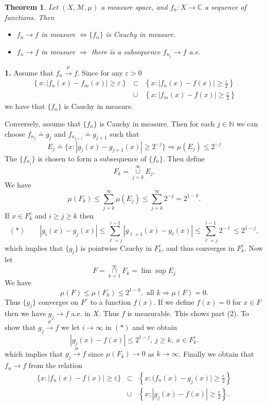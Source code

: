 \documentclass[12pt]{report}
\newtheorem{theorem}{Theorem}[section]
\begin{document}
\begin{theorem} Let $(X, \mathcal{M}, \mu)$ a measure space, and
$f_n: X \longrightarrow \mathbb{C}$ a sequence of functions.  Then
\begin{itemize}
\item[1.]   $f_n \longrightarrow f$ in measure $\Longleftrightarrow
\{f_n\}$ is Cauchy in measure.
\item[2.]  $f_n \longrightarrow f$ in measure $\Longrightarrow $ there is
a subsequence $f_{n_j} \to f$ a.e.
\end{itemize}
\end{theorem}

\medskip
{} \textbf{1.}  Assume that $f_n
\stackrel{\mu}{\longrightarrow} f$. Since for any $\varepsilon > 0 $
\begin{eqnarray*}
\left \{x: |f_n(x) - f_m(x) | \ge \varepsilon \right \} &\subset&
\left \{x: |f_n(x) - f(x)|\ge\frac{\varepsilon}{2}\right \}\\ &\cup& \left
\{x : |f_m(x) - f(x) | \ge \frac{\varepsilon}{2}\right \}
\end{eqnarray*} we have that $ \{f_n\}$ is Cauchy in measure.

Conversely, assume that $\{f_n\}$ is Cauchy in measure.  Then for each $j
\in
\mathbb{N}$ we can choose $f_{n_j} \doteq	 g_j$ and $f_{n_{j+1}} \doteq
g_{j+1}$ such that
\[ E_j \doteq \{x: |g_j(x) - g_{j+1} (x)| \ge 2^{-j}\} \Longrightarrow
\mu(E_j) \le 2^{-j}
\] The $\{f_{n_j}\}$ is chosen to form a subsequence of $\{f_n\}$.  Then
define
\[ F_k = \overset{\infty}{\underset{j=k}{\cup}} E_j.
\] We have
\[
\mu(F_k) \le \sum^\infty_{j=k} \mu(E_j) \le \sum^\infty_{j=k} 2^{-j} =
2^{1-k}.
\] If $ x \in F^c_k $ and $i \ge j \ge k$ then 
\[ (\ast) \qquad  |g_i(x) - g_j(x)| \le \sum^{i-1}_{\ell=j} |g_{\ell + 1} (x) -
g_\ell (x)|
\le \sum^{i-1}_{\ell = j}2^{-\ell} \le 2^{1 - j},
\] which implies that $\{g_j\}$ is pointwise Cauchy in $F^c_k$, and thus
converges in $F^c_k$.  Now let
\[ F = \overset{\infty}{\underset{k=1}{\cap}} F_k = \lim \sup E_j
\] We have
\[\mu(F) \le \mu(F_k) \le 2^{1-k} , \mbox{ all } k\Longrightarrow \mu(F)
= 0.
\] Thus $\{g_j\}$ converges on $F^c$ to a function $f(x)$. If we define 
$f(x) = 0$ for
$x \in F$ then we have $g_j \longrightarrow f$ a.e. in $X$.  Thus $f$ is
measurable.  This shows part (2).  To show that $g_j
\stackrel{\mu}{\longrightarrow } f$ we let $i \rightarrow \infty$ in
$(\ast)$ and we obtain
\[ |g_j(x) - f(x) | \le 2^{1 - j}, \ j \ge k, \ x \in F^c_k.
\] which implies that $g_j \stackrel{\mu}{\longrightarrow} f$ since
$\mu(F_k) \to 0$ as $k \to \infty$.  Finally we obtain that $f_n
\longrightarrow f$ from the relation
\begin{eqnarray*}
\{x: |f_n(x) - f(x) | \ge \varepsilon \} &\subset& \left \{x: (f_n(x) - g_j(x)|
\ge
\frac{\varepsilon}{2}\right \}\\ &\cup& \left \{x: |g_j (x) - f(x) | \ge
\frac{\varepsilon}{2} \right \}.
\end{eqnarray*}
\end{document}
